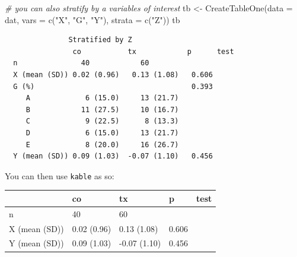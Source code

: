\documentclass[
  letterpaper,
  DIV=11,
  numbers=noendperiod]{scrreprt}
\newenvironment{Shaded}{\begin{snugshade}}{\end{snugshade}}
\newcommand{\AttributeTok}[1]{\textcolor[rgb]{0.49,0.56,0.16}{#1}}
\newcommand{\CommentTok}[1]{\textcolor[rgb]{0.38,0.63,0.69}{\textit{#1}}}
\newcommand{\ConstantTok}[1]{\textcolor[rgb]{0.53,0.00,0.00}{#1}}
\newcommand{\FunctionTok}[1]{\textcolor[rgb]{0.02,0.16,0.49}{#1}}
\newcommand{\NormalTok}[1]{\textcolor[rgb]{0.00,0.44,0.13}{#1}}
\newcommand{\OtherTok}[1]{\textcolor[rgb]{0.00,0.44,0.13}{#1}}
\newcommand{\SpecialCharTok}[1]{\textcolor[rgb]{0.25,0.44,0.63}{#1}}
\newcommand{\StringTok}[1]{\textcolor[rgb]{0.25,0.44,0.63}{#1}}
\begin{document}
\begin{Shaded}
\begin{Highlighting}[]
\CommentTok{\# you can also stratify by a variables of interest}
\NormalTok{tb }\OtherTok{\textless{}{-}} \FunctionTok{CreateTableOne}\NormalTok{(}\AttributeTok{data =}\NormalTok{ dat,}
                     \AttributeTok{vars =} \FunctionTok{c}\NormalTok{(}\StringTok{"X"}\NormalTok{, }\StringTok{"G"}\NormalTok{, }\StringTok{"Y"}\NormalTok{), }
                     \AttributeTok{strata =} \FunctionTok{c}\NormalTok{(}\StringTok{"Z"}\NormalTok{))}
\NormalTok{tb}
\end{Highlighting}
\end{Shaded}

\begin{verbatim}
               Stratified by Z
                co           tx            p      test
  n               40            60                    
  X (mean (SD)) 0.02 (0.96)   0.13 (1.08)   0.606     
  G (%)                                     0.393     
     A             6 (15.0)     13 (21.7)             
     B            11 (27.5)     10 (16.7)             
     C             9 (22.5)      8 (13.3)             
     D             6 (15.0)     13 (21.7)             
     E             8 (20.0)     16 (26.7)             
  Y (mean (SD)) 0.09 (1.03)  -0.07 (1.10)   0.456     
\end{verbatim}

You can then use \texttt{kable} as so:

\begin{Shaded}
\end{Shaded}

\begin{longtable}[]{@{}lllll@{}}
\toprule\noalign{}
& co & tx & p & test \\
\midrule\noalign{}
\endhead
\bottomrule\noalign{}
\endlastfoot
n & 40 & 60 & & \\
X (mean (SD)) & 0.02 (0.96) & 0.13 (1.08) & 0.606 & \\
Y (mean (SD)) & 0.09 (1.03) & -0.07 (1.10) & 0.456 & \\
\end{longtable}
\end{document}
